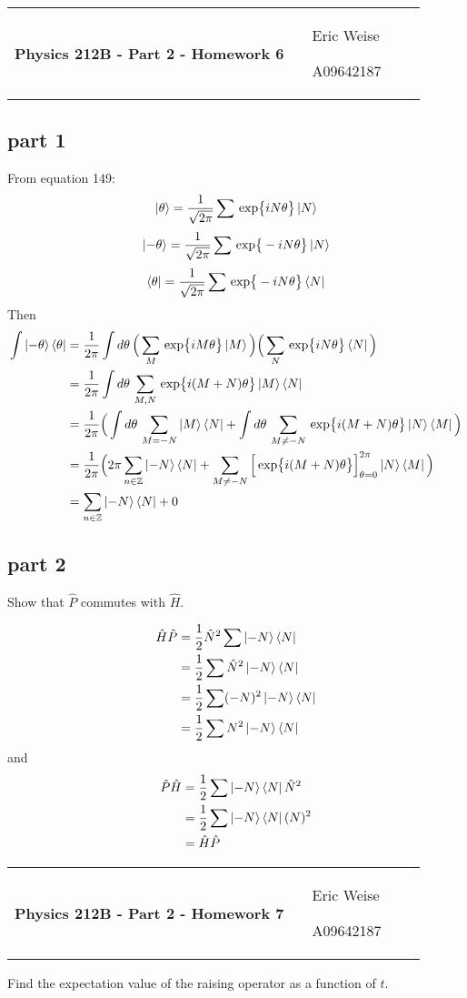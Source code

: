 \documentclass{article}
\newcommand{\assignment}[2]{
    \newpage
    \begin{tabular}{p{0.65\linewidth}p{0.25\linewidth}}
        {\bf\LARGE Physics 212B - Part #1 - Homework #2 }
        &
        \parbox[b]{0.24\textwidth}{
            \hfill Eric Weise

            \hfill A09642187
            }
    \end{tabular}
    \vspace{12pt}
    \newline
}
\newcommand{\D}[1]{{d#1 \,}}
\renewcommand{\exp}[1]{\,\text{exp} \big\{ #1 \big\} }
\begin{document}
\assignment{2}{6}
\subsection*{part 1}
From equation 149:
\[ \ket{\theta} = \frac{1}{\sqrt{2\pi}} \sum \exp{iN\theta} \ket{N} \]
\[ \ket{-\theta} = \frac{1}{\sqrt{2\pi}} \sum \exp{-iN\theta} \ket{N} \]
\[ \bra{\theta} = \frac{1}{\sqrt{2\pi}} \sum \exp{-iN\theta} \bra{N} \]
Then
\begin{align*}
    \int \ket{-\theta}\bra{\theta}
    &= \frac{1}{2\pi} \int \D{\theta} \Big( \sum_M\exp{iM\theta}\ket{M} \Big) \Big( \sum_N \exp{iN\theta}\bra{N} \Big) \\
    &= \frac{1}{2\pi} \int \D{\theta} \sum_{M,N}\exp{i(M+N)\theta}\ket{M}\bra{N} \\
    &= \frac{1}{2\pi} \Big( \int \D{\theta} \sum_{M=-N}\ket{M}\bra{N} + \int \D{\theta} \sum_{M\neq-N} \exp{i(M+N)\theta}\ket{N}\bra{M} \Big) \\
    &= \frac{1}{2\pi} \Big( 2\pi \sum_{n\in\mathbb{Z}} \ket{-N}\bra{N} + \sum_{M\neq-N} \Big[ \exp{i(M+N)\theta}\Big]_{\theta=0}^{2\pi} \ket{N}\bra{M}  \Big) \\
    &= \sum_{n\in\mathbb{Z}} \ket{-N}\bra{N} + 0
\end{align*}

\subsection*{part 2}
Show that $\hat{P}$ commutes with $\hat{H}$.

\begin{align*}
    \hat{H}\hat{P}
    &= \frac{1}{2}\hat{N}^2\sum\ket{-N}\bra{N} \\
    &= \frac{1}{2} \sum \hat{N}^2\ket{-N}\bra{N} \\
    &= \frac{1}{2} \sum (-N)^2\ket{-N}\bra{N} \\
    &= \frac{1}{2} \sum N^2\ket{-N}\bra{N}
\end{align*}
and
\begin{align*}
    \hat{P}\hat{H}
    &= \frac{1}{2} \sum \ket{-N}\bra{N} \hat{N}^2 \\
    &= \frac{1}{2} \sum \ket{-N}\bra{N} (N)^2 \\
    &= \hat{H}\hat{P}
\end{align*}


\assignment{2}{7}
Find the expectation value of the raising operator as a function of $t$.
\end{document}
